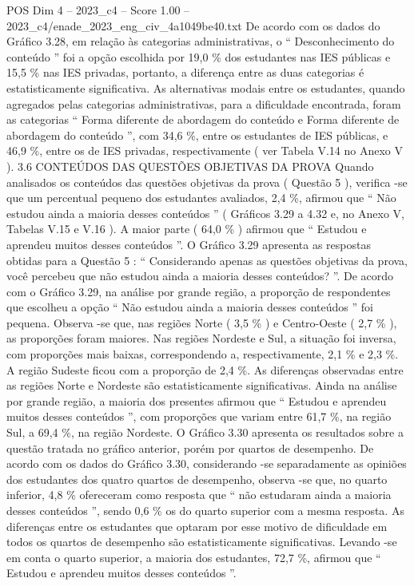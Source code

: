 \begin{textsample}{POS Dim 4 – 2023\_c4 – Score 1.00 – 2023\_c4/enade\_2023\_eng\_civ\_4a1049be40.txt}
De acordo com os dados do Gráfico 3.28, em relação às categorias administrativas, o “ Desconhecimento do conteúdo ” foi a opção escolhida por 19,0 \% dos estudantes nas IES públicas e 15,5 \% nas IES privadas, portanto, a diferença entre as duas categorias é estatisticamente significativa.
As alternativas modais entre os estudantes, quando agregados pelas categorias administrativas, para a dificuldade encontrada, foram as categorias “ Forma diferente de abordagem do conteúdo e Forma diferente de abordagem do conteúdo ”, com 34,6 \%, entre os estudantes de IES públicas, e 46,9 \%, entre os de IES privadas, respectivamente ( ver Tabela V.14 no Anexo V ). 3.6 CONTEÚDOS DAS QUESTÕES OBJETIVAS DA PROVA Quando analisados os conteúdos das questões objetivas da prova ( Questão 5 ), verifica -se que um percentual pequeno dos estudantes avaliados, 2,4 \%, afirmou que “ Não estudou ainda a maioria desses conteúdos ” ( Gráficos 3.29 a 4.32 e, no Anexo V, Tabelas V.15 e V.16 ).
A maior parte ( 64,0 \% ) afirmou que “ Estudou e aprendeu muitos desses conteúdos ”.
O Gráfico 3.29 apresenta as respostas obtidas para a Questão 5 : “ Considerando apenas as questões objetivas da prova, você percebeu que não estudou ainda a maioria desses conteúdos? ”.
De acordo com o Gráfico 3.29, na análise por grande região, a proporção de respondentes que escolheu a opção “ Não estudou ainda a maioria desses conteúdos ” foi pequena.
Observa -se que, nas regiões Norte ( 3,5 \% ) e Centro-Oeste ( 2,7 \% ), as proporções foram maiores.
Nas regiões Nordeste e Sul, a situação foi inversa, com proporções mais baixas, correspondendo a, respectivamente, 2,1 \% e 2,3 \%.
A região Sudeste ficou com a proporção de 2,4 \%.
As diferenças observadas entre as regiões Norte e Nordeste são estatisticamente significativas.
Ainda na análise por grande região, a maioria dos presentes afirmou que “ Estudou e aprendeu muitos desses conteúdos ”, com proporções que variam entre 61,7 \%, na região Sul, a 69,4 \%, na região Nordeste.
O Gráfico 3.30 apresenta os resultados sobre a questão tratada no gráfico anterior, porém por quartos de desempenho.
De acordo com os dados do Gráfico 3.30, considerando -se separadamente as opiniões dos estudantes dos quatro quartos de desempenho, observa -se que, no quarto inferior, 4,8 \% ofereceram como resposta que “ não estudaram ainda a maioria desses conteúdos ”, sendo 0,6 \% os do quarto superior com a mesma resposta.
As diferenças entre os estudantes que optaram por esse motivo de dificuldade em todos os quartos de desempenho são estatisticamente significativas.
Levando -se em conta o quarto superior, a maioria dos estudantes, 72,7 \%, afirmou que “ Estudou e aprendeu muitos desses conteúdos ”.

\end{textsample}
